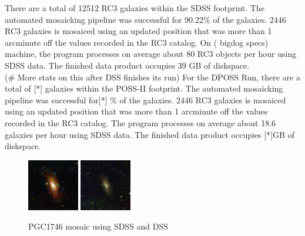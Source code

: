\documentclass[5p]{elsarticle}
\begin{document}
\indent There are a total of 12512 RC3 galaxies within the SDSS footprint. The automated mosaicking pipeline was  successful for 90.22\% of the galaxies. 2446 RC3 galaxies is mosaiced using an updated position that was more than 1 arcminute off the values recorded in the RC3 catalog.  On ( bigdog specs)  machine, the program processes on average about 80 RC3 objects per hour using SDSS data.  %
The finished data product occupies 39 GB of diskspace. 
\\
\indent  (\# More stats on this after DSS finishes its run) 
 For the DPOSS Run, there are a total of [*] galaxies within the POSS-II footprint.
 The automated mosaicking pipeline was  successful for[*] \% of the galaxies. 2446 RC3 galaxies is mosaiced using an updated position that was more than 1 arcminute off the values recorded in the RC3 catalog. The program processes on average about 18.6 galaxies per hour using SDSS data.  %
The finished data product occupies [*]GB of diskspace. 
\begin{figure}[h]
 \centering
	\includegraphics[width=0.2\textwidth]{figures/SDSS_1154_BEST}
	\includegraphics[width=0.2\textwidth]{figures/DSS_1154_BEST}	
	\caption{PGC1746 mosaic using SDSS and DSS}
\end{figure}
\end{document}

